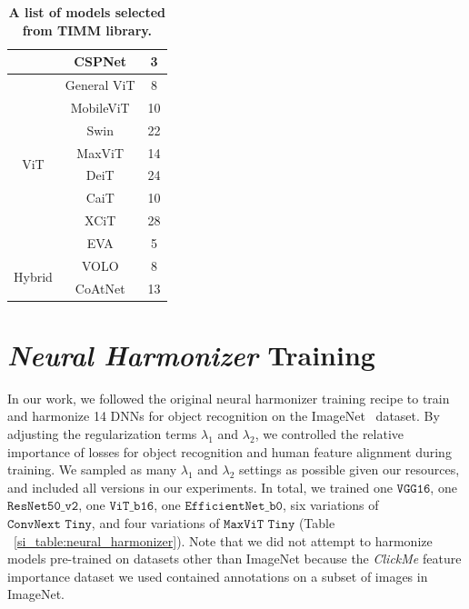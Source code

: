 \documentclass{article}
\theoremstyle{plain}
\theoremstyle{definition}
\theoremstyle{remark}
\begin{document}
\begin{table}[h]
\begin{tabular}{ccc}
                        & CSPNet            & 3                \\ 
\hline
\multirow{8}{*}{ViT}    & General ViT       & 8                \\
                        & MobileViT         & 10               \\
                        & Swin              & 22               \\
                        & MaxViT            & 14               \\
                        & DeiT              & 24               \\
                        & CaiT              & 10               \\
                        & XCiT              & 28               \\
                        & EVA               & 5                \\ 
\hline
\multirow{2}{*}{Hybrid} & VOLO              & 8                \\
                        & CoAtNet           & 13               \\
\hline
\end{tabular}

\caption{ \label{si_table:SI_model_zoo} \textbf{A list of models selected from TIMM library.}}

\end{table}


\section{\textit{Neural Harmonizer} Training}\label{si_sec:neural_harmonizer}

In our work, we followed the original neural harmonizer training recipe to train and harmonize 14 DNNs for object recognition on the ImageNet~\cite{Deng2009-jk} dataset. By adjusting the regularization terms $\lambda_1$ and $\lambda_2$, we controlled the relative importance of losses for object recognition and human feature alignment during training. We sampled as many $\lambda_1$ and $\lambda_2$ settings as possible given our resources, and included all versions in our experiments. In total, we trained one $\texttt{VGG16}$, one $\texttt{ResNet50\_v2}$, one $\texttt{ViT\_b16}$, one $\texttt{EfficientNet\_b0}$, six variations of $\texttt{ConvNext Tiny}$, and four variations of $\texttt{MaxViT Tiny}$ (Table ~\ref{si_table:neural_harmonizer}). Note that we did not attempt to harmonize models pre-trained on datasets other than ImageNet because the \emph{ClickMe} feature importance dataset we used contained annotations on a subset of images in ImageNet.
\end{document}
